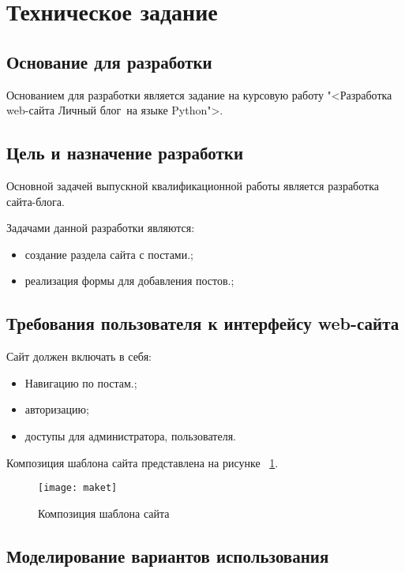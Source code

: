 \section{Техническое задание}
\subsection{Основание для разработки}

Основанием для разработки является задание на курсовую работу "<Разработка web-сайта \textquotedbl Личный блог\textquotedbl\ на языке Python">.

\subsection{Цель и назначение разработки}

Основной задачей выпускной квалификационной работы является 
разработка сайта-блога.

Задачами данной разработки являются:
\begin{itemize}
\item создание раздела сайта с постами.;
\item реализация формы для добавления постов.;
\end{itemize}

\subsection{Требования пользователя к интерфейсу web-сайта}

Сайт должен включать в себя:
\begin{itemize}
    \item Навигацию по постам.;
    \item авторизацию;
    \item доступы для администратора, пользователя.
\end{itemize}

Композиция шаблона сайта представлена на рисунке ~\ref{maket:image}.

\begin{figure}[ht]
\texttt{[image: maket]}
\caption{Композиция шаблона сайта}
\label{maket:image}
\end{figure}

\subsection{Моделирование вариантов использования}


